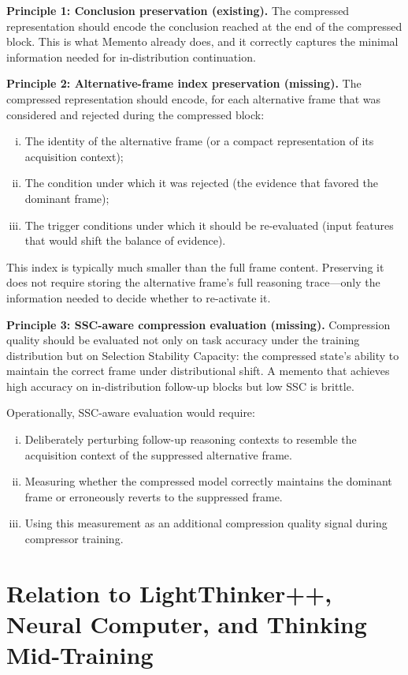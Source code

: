 \documentclass[12pt]{article}
\begin{document}
\textbf{Principle 1: Conclusion preservation (existing).}
The compressed representation should encode the conclusion reached at
the end of the compressed block. This is what Memento already does, and
it correctly captures the minimal information needed for in-distribution
continuation.

\textbf{Principle 2: Alternative-frame index preservation (missing).}
The compressed representation should encode, for each alternative frame
that was considered and rejected during the compressed block:
\begin{enumerate}[(i)]
\item The identity of the alternative frame (or a compact representation
  of its acquisition context);
\item The condition under which it was rejected (the evidence that
  favored the dominant frame);
\item The trigger conditions under which it should be re-evaluated
  (input features that would shift the balance of evidence).
\end{enumerate}

This index is typically much smaller than the full frame content.
Preserving it does not require storing the alternative frame's full
reasoning trace---only the information needed to decide whether to
re-activate it.

\textbf{Principle 3: SSC-aware compression evaluation (missing).}
Compression quality should be evaluated not only on task accuracy under
the training distribution but on Selection Stability Capacity: the
compressed state's ability to maintain the correct frame under
distributional shift. A memento that achieves high accuracy on
in-distribution follow-up blocks but low SSC is brittle.

Operationally, SSC-aware evaluation would require:
\begin{enumerate}[(i)]
\item Deliberately perturbing follow-up reasoning contexts to resemble
  the acquisition context of the suppressed alternative frame.
\item Measuring whether the compressed model correctly maintains the
  dominant frame or erroneously reverts to the suppressed frame.
\item Using this measurement as an additional compression quality signal
  during compressor training.
\end{enumerate}

\section{Relation to LightThinker++, Neural Computer, and Thinking Mid-Training}
\end{document}
